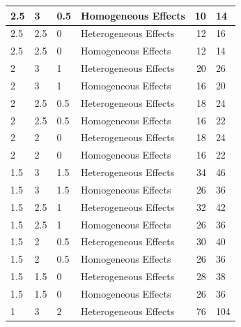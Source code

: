 \documentclass[
]{article}
\begin{document}
\begin{table}[H]
\begin{tabular}{l|l|l|l|r|l}
\hline
\hspace{1em}2.5 & 3 & 0.5 & Homogeneous Effects & 10 & 14\\
\hline
\hspace{1em}2.5 & 2.5 & 0 & Heterogeneous Effects & 12 & 16\\
\hline
\hspace{1em}2.5 & 2.5 & 0 & Homogeneous Effects & 12 & 14\\
\hline
\hspace{1em}2 & 3 & 1 & Heterogeneous Effects & 20 & 26\\
\hline
\hspace{1em}2 & 3 & 1 & Homogeneous Effects & 16 & 20\\
\hline
\hspace{1em}2 & 2.5 & 0.5 & Heterogeneous Effects & 18 & 24\\
\hline
\hspace{1em}2 & 2.5 & 0.5 & Homogeneous Effects & 16 & 22\\
\hline
\hspace{1em}2 & 2 & 0 & Heterogeneous Effects & 18 & 24\\
\hline
\hspace{1em}2 & 2 & 0 & Homogeneous Effects & 16 & 22\\
\hline
\hspace{1em}1.5 & 3 & 1.5 & Heterogeneous Effects & 34 & 46\\
\hline
\hspace{1em}1.5 & 3 & 1.5 & Homogeneous Effects & 26 & 36\\
\hline
\hspace{1em}1.5 & 2.5 & 1 & Heterogeneous Effects & 32 & 42\\
\hline
\hspace{1em}1.5 & 2.5 & 1 & Homogeneous Effects & 26 & 36\\
\hline
\hspace{1em}1.5 & 2 & 0.5 & Heterogeneous Effects & 30 & 40\\
\hline
\hspace{1em}1.5 & 2 & 0.5 & Homogeneous Effects & 26 & 36\\
\hline
\hspace{1em}1.5 & 1.5 & 0 & Heterogeneous Effects & 28 & 38\\
\hline
\hspace{1em}1.5 & 1.5 & 0 & Homogeneous Effects & 26 & 36\\
\hline
\hspace{1em}1 & 3 & 2 & Heterogeneous Effects & 76 & 104\\

\end{tabular}
\end{table}
\end{document}
